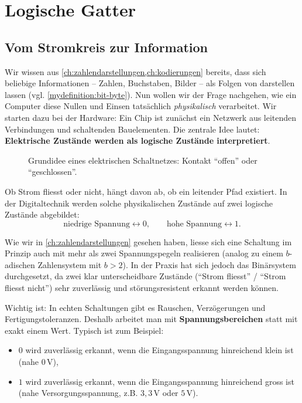\chapter{Logische Gatter}\label{ch:logische_gatter}

\section{Vom Stromkreis zur Information}

Wir wissen aus \cref{ch:zahlendarstellungen,ch:kodierungen} bereits, dass sich beliebige Informationen -- Zahlen, Buchstaben, Bilder -- als Folgen von  darstellen lassen (vgl. \cref{mydefinition:bit-byte}). Nun wollen wir der Frage nachgehen, wie ein Computer diese Nullen und Einsen tatsächlich \emph{physikalisch} verarbeitet. Wir starten dazu bei der Hardware: Ein Chip ist zunächst ein Netzwerk aus leitenden Verbindungen und schaltenden Bauelementen. Die zentrale Idee lautet: \textbf{Elektrische Zustände werden als logische Zustände interpretiert}.

\begin{figure}[H]
    \centering
    
    \caption{Grundidee eines elektrischen Schaltnetzes: Kontakt \enquote{offen} oder \enquote{geschlossen}.}
    \label{fig:stromkreis_grundidee}
\end{figure}

Ob Strom fliesst oder nicht, hängt davon ab, ob ein leitender Pfad existiert. In der Digitaltechnik werden solche physikalischen Zustände auf zwei logische Zustände abgebildet:
\[
    \text{niedrige Spannung} \longleftrightarrow 0,
    \qquad
    \text{hohe Spannung} \longleftrightarrow 1.
\]

\begin{myremark}
    Wie wir in \cref{ch:zahlendarstellungen} gesehen haben, liesse sich eine Schaltung im Prinzip auch mit mehr als zwei Spannungspegeln realisieren (analog zu einem $b$-adischen Zahlensystem mit $b>2$). In der Praxis hat sich jedoch das Binärsystem durchgesetzt, da zwei klar unterscheidbare Zustände (\enquote{Strom fliesst} / \enquote{Strom fliesst nicht}) sehr zuverlässig und störungsresistent erkannt werden können.
\end{myremark}

Wichtig ist: In echten Schaltungen gibt es Rauschen, Verzögerungen und Fertigungstoleranzen. Deshalb arbeitet man mit \textbf{Spannungsbereichen} statt mit exakt einem Wert. Typisch ist zum Beispiel:
\begin{itemize}
    \item $0$ wird zuverlässig erkannt, wenn die Eingangsspannung hinreichend klein ist (nahe $0\,\mathrm{V}$),
    \item $1$ wird zuverlässig erkannt, wenn die Eingangsspannung hinreichend gross ist (nahe Versorgungsspannung, z.B. $3{,}3\,\mathrm{V}$ oder $5\,\mathrm{V}$).
\end{itemize}

